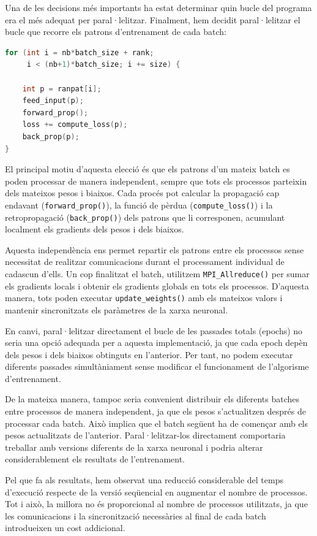 \documentclass{article}
\begin{document}
Una de les decisions més importants ha estat determinar quin bucle del programa era el més adequat per paral·lelitzar. Finalment, hem decidit paral·lelitzar el bucle que recorre els patrons d'entrenament de cada batch:

\begin{lstlisting}[language=C]
for (int i = nb*batch_size + rank;
     i < (nb+1)*batch_size; i += size) {

    int p = ranpat[i];
    feed_input(p);
    forward_prop();
    loss += compute_loss(p);
    back_prop(p);
}
\end{lstlisting}

El principal motiu d'aquesta elecció és que els patrons d'un mateix batch es poden processar de manera independent, sempre que tots els processos parteixin dels mateixos pesos i biaixos. Cada procés pot calcular la propagació cap endavant (\texttt{forward\_prop()}), la funció de pèrdua (\texttt{compute\_loss()}) i la retropropagació (\texttt{back\_prop()}) dels patrons que li corresponen, acumulant localment els gradients dels pesos i dels biaixos.

Aquesta independència ens permet repartir els patrons entre els processos sense necessitat de realitzar comunicacions durant el processament individual de cadascun d'ells. Un cop finalitzat el batch, utilitzem \texttt{MPI\_Allreduce()} per sumar els gradients locals i obtenir els gradients globals en tots els processos. D'aquesta manera, tots poden executar \texttt{update\_weights()} amb els mateixos valors i mantenir sincronitzats els paràmetres de la xarxa neuronal.

En canvi, paral·lelitzar directament el bucle de les passades totals (epochs) no seria una opció adequada per a aquesta implementació, ja que cada epoch depèn dels pesos i dels biaixos obtinguts en l'anterior. Per tant, no podem executar diferents passades simultàniament sense modificar el funcionament de l'algorisme d'entrenament.

De la mateixa manera, tampoc seria convenient distribuir els diferents batches entre processos de manera independent, ja que els pesos s'actualitzen després de processar cada batch. Això implica que el batch següent ha de començar amb els pesos actualitzats de l'anterior. Paral·lelitzar-los directament comportaria treballar amb versions diferents de la xarxa neuronal i podria alterar considerablement els resultats de l'entrenament.

Pel que fa als resultats, hem observat una reducció considerable del temps d'execució respecte de la versió seqüencial en augmentar el nombre de processos. Tot i això, la millora no és proporcional al nombre de processos utilitzats, ja que les comunicacions i la sincronització necessàries al final de cada batch introdueixen un cost addicional.
\end{document}
